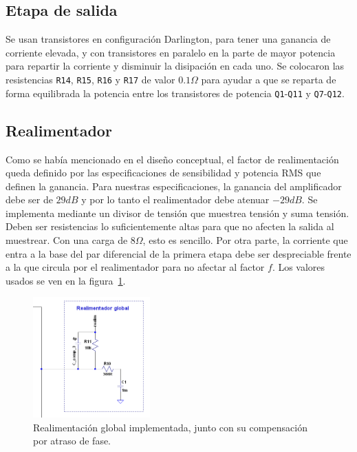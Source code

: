 \subsection{Etapa de salida}

Se usan transistores en configuración Darlington, para tener una ganancia de corriente elevada, y con transistores en paralelo en la parte de mayor potencia para repartir la corriente y disminuir la disipación en cada uno. Se colocaron las resistencias \texttt{R14}, \texttt{R15}, \texttt{R16} y \texttt{R17} de valor $0.1\Omega$ para ayudar a que se reparta de forma equilibrada la potencia entre los transistores de potencia \texttt{Q1}-\texttt{Q11} y \texttt{Q7}-\texttt{Q12}.




\subsection{Realimentador}

Como se había mencionado en el diseño conceptual, el factor de realimentación queda definido por las especificaciones de sensibilidad y potencia RMS que definen la ganancia. Para nuestras especificaciones, la ganancia del amplificador debe ser de $29dB$ y por lo tanto el realimentador debe atenuar $-29dB$. Se implementa mediante un divisor de tensión que muestrea tensión y suma tensión. Deben ser resistencias lo suficientemente altas para que no afecten la salida al muestrear. Con una carga de $8\Omega$, esto es sencillo. Por otra parte, la corriente que entra a la base del par diferencial de la primera etapa debe ser despreciable frente a la que circula por el realimentador para no afectar al factor $f$. Los valores usados se ven en la figura~\ref{fig:realimentacion-global}.

\begin{figure}[H]
	\centering
	\includegraphics[width=0.4\textwidth]{img/realimentacion-global}
	\caption{Realimentación global implementada, junto con su compensación por atraso de fase.}
	\label{fig:realimentacion-global}
\end{figure}
 
